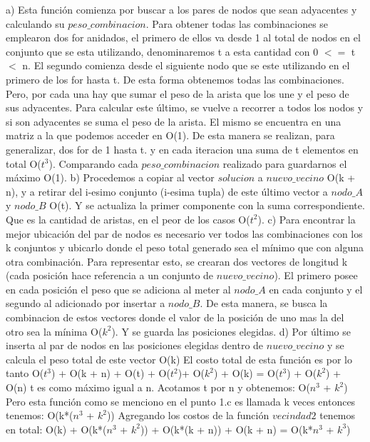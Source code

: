 \documentclass[a4paper]{article}
\begin{document}
a) Esta funci\'on comienza por buscar a los pares de nodos que sean adyacentes y calculando su $peso\_combinacion$. Para obtener todas las combinaciones se emplearon dos for anidados, el primero de ellos va desde 1 al total de nodos en el conjunto que se esta utilizando, denominaremos t a esta cantidad con 0 $<=$ t $<$ n. El segundo comienza desde el siguiente nodo que se este utilizando en el primero de los for hasta t. De esta forma obtenemos todas las combinaciones. Pero, por cada una hay que sumar el peso de la arista que los une y el peso de sus adyacentes. Para calcular este \'ultimo, se vuelve a recorrer a todos los nodos y si son adyacentes se suma el peso de la arista. El mismo se encuentra en una matriz a la que podemos acceder en O(1). De esta manera se realizan, para generalizar, dos for de 1 hasta t. y en cada iteracion una suma de t elementos en total O($t^{3}$).
Comparando cada $peso\_combinacion$ realizado para guardarnos el m\'aximo O(1). \newline
b) Procedemos a copiar al vector $solucion$ a $nuevo\_vecino$ O(k + n), y a retirar del i-esimo conjunto (i-esima tupla) de este \'ultimo vector a $nodo\_A$ y $nodo\_B$ O(t).  Y se actualiza la primer componente con la suma correspondiente. Que es la cantidad de aristas, en el peor de los casos O($t^{2}$).  \newline
c) Para encontrar la mejor ubicaci\'on del par de nodos es necesario ver todos las combinaciones con los k conjuntos y ubicarlo donde el peso total generado sea el m\'inimo que con alguna otra combinaci\'on. Para representar esto, se crearan dos vectores de longitud k (cada posici\'on  hace referencia a un conjunto de $nuevo\_vecino$). El primero posee en cada posici\'on el peso que se adiciona al meter al $nodo\_A$ en cada conjunto y el segundo al adicionado por insertar a $nodo\_B$. De esta manera, se busca la combinacion de estos vectores donde el valor de la posici\'on de uno mas la del otro sea la m\'inima O($k^{2}$). Y se guarda las posiciones elegidas. \newline
d) Por \'ultimo se inserta al par de nodos en las posiciones elegidas dentro de $nuevo\_vecino$ y se calcula el peso total de este vector O(k)\newline \newline
El costo total de esta funci\'on es por lo tanto O($t^{3}$) + O(k + n) + O(t) + O($t^{2}$)+ O($k^{2}$) + O(k) = O($t^{3}$) + O($k^{2}$) + O(n) \newline t es como m\'aximo igual a n. Acotamos t por n y obtenemos: \newline O($n^{3}$ + $k^{2}$) \newline
Pero esta funci\'on como se menciono en el punto 1.c es llamada k veces entonces tenemos: \newline O(k*($n^{3}$ + $k^{2}$)) \newline
Agregando los costos de la funci\'on $vecindad2$ tenemos en total: \newline 
O(k) + O(k*($n^{3}$ + $k^{2}$)) + O(k*(k + n)) + O(k + n) = O(k*$n^{3}$ + $k^{3}$) 
\end{document}
